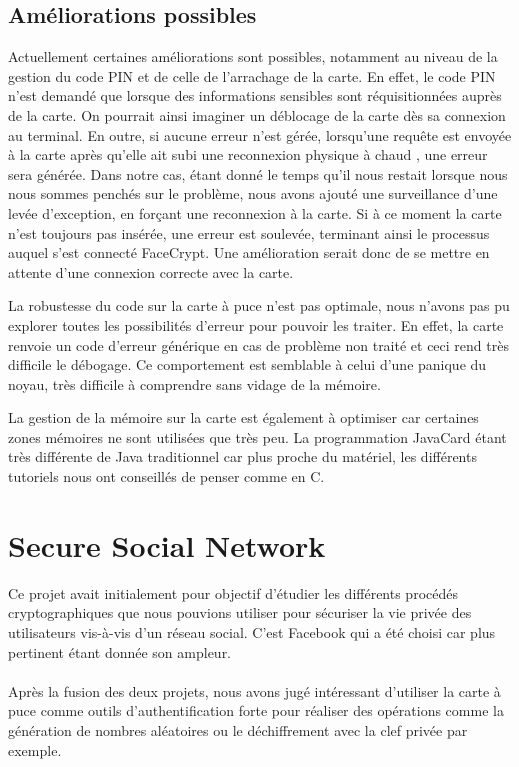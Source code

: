 \documentclass[a4paper,11pt,french]{article}
\begin{document}
\subsection{Améliorations possibles}
Actuellement certaines améliorations sont possibles, notamment au niveau
de la gestion du code PIN et de celle de l'arrachage de la carte. En effet,
le code PIN n'est demandé que lorsque des informations sensibles sont
réquisitionnées auprès de la carte. On pourrait ainsi imaginer un déblocage
de la carte dès sa connexion au terminal. En outre, si aucune erreur n'est gérée,
lorsqu'une requête est envoyée à la carte après qu'elle ait subi une reconnexion
physique \og à chaud \fg{}, une erreur sera générée. Dans notre cas, étant donné
le temps qu'il nous restait lorsque nous nous sommes penchés sur le problème, 
nous avons ajouté une surveillance d'une levée d'exception, en forçant une 
reconnexion à la carte. Si à ce moment la carte n'est toujours pas insérée,
une erreur est soulevée, terminant ainsi le processus auquel s'est connecté
FaceCrypt. Une amélioration serait donc de se mettre en attente d'une connexion
correcte avec la carte.

La robustesse du code sur la carte à puce n'est pas optimale, nous n'avons pas pu explorer toutes les possibilités d'erreur 
pour pouvoir les traiter. En effet, la carte renvoie un code d'erreur générique en cas de problème non traité et ceci rend très difficile
 le débogage. Ce comportement est semblable à celui d'une panique du noyau, très difficile à comprendre sans vidage de la mémoire.


La gestion de la mémoire sur la carte est également à optimiser car certaines zones mémoires ne sont utilisées que très peu. La programmation JavaCard étant très différente de Java traditionnel car plus proche du matériel, les différents tutoriels nous ont conseillés de penser comme en C. 

\clearpage

\section{Secure Social Network}
Ce projet avait initialement pour objectif d'étudier les différents 
procédés cryptographiques que nous pouvions utiliser pour sécuriser la vie
privée des utilisateurs vis-à-vis d'un réseau social. C'est Facebook qui a 
été choisi car plus pertinent étant donnée son ampleur.

\paragraph{}
Après la fusion des deux projets, nous avons jugé intéressant d'utiliser 
la carte à puce comme outils d'authentification forte pour réaliser des 
opérations comme la génération de nombres aléatoires ou le déchiffrement 
avec la clef privée par exemple.
\end{document}
